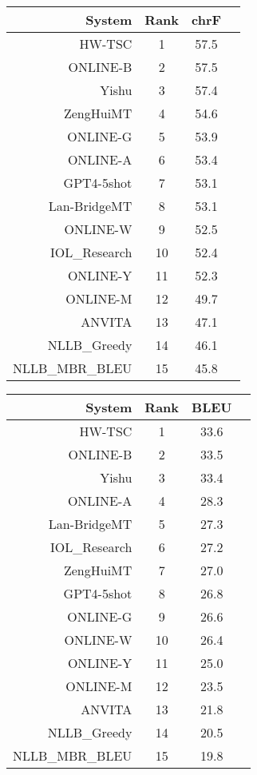 \documentclass[11pt]{article}
\begin{document}
\begin{table}  
\scriptsize\begin{subtable}[t]{0.33\textwidth}
\begin{tabular}{rccc}
\toprule 
System & Rank & chrF \\ 
\midrule 
HW-TSC & 1 & 57.5 \\ 
ONLINE-B & 2 & 57.5 \\ 
Yishu & 3 & 57.4 \\ 
ZengHuiMT & 4 & 54.6 \\ 
ONLINE-G & 5 & 53.9 \\ 
ONLINE-A & 6 & 53.4 \\ 
GPT4-5shot & 7 & 53.1 \\ 
Lan-BridgeMT & 8 & 53.1 \\ 
ONLINE-W & 9 & 52.5 \\ 
IOL\_Research & 10 & 52.4 \\ 
ONLINE-Y & 11 & 52.3 \\ 
ONLINE-M & 12 & 49.7 \\ 
ANVITA & 13 & 47.1 \\ 
NLLB\_Greedy & 14 & 46.1 \\ 
NLLB\_MBR\_BLEU & 15 & 45.8 \\ 
\bottomrule 
\end{tabular} 
\end{subtable} 
\begin{subtable}[t]{0.33\textwidth}
\begin{tabular}{rccc}
\toprule 
System & Rank & BLEU \\ 
\midrule 
HW-TSC & 1 & 33.6 \\ 
ONLINE-B & 2 & 33.5 \\ 
Yishu & 3 & 33.4 \\ 
ONLINE-A & 4 & 28.3 \\ 
Lan-BridgeMT & 5 & 27.3 \\ 
IOL\_Research & 6 & 27.2 \\ 
ZengHuiMT & 7 & 27.0 \\ 
GPT4-5shot & 8 & 26.8 \\ 
ONLINE-G & 9 & 26.6 \\ 
ONLINE-W & 10 & 26.4 \\ 
ONLINE-Y & 11 & 25.0 \\ 
ONLINE-M & 12 & 23.5 \\ 
ANVITA & 13 & 21.8 \\ 
NLLB\_Greedy & 14 & 20.5 \\ 
NLLB\_MBR\_BLEU & 15 & 19.8 \\ 

\end{tabular}
\end{subtable}
\end{table}
\end{document}
